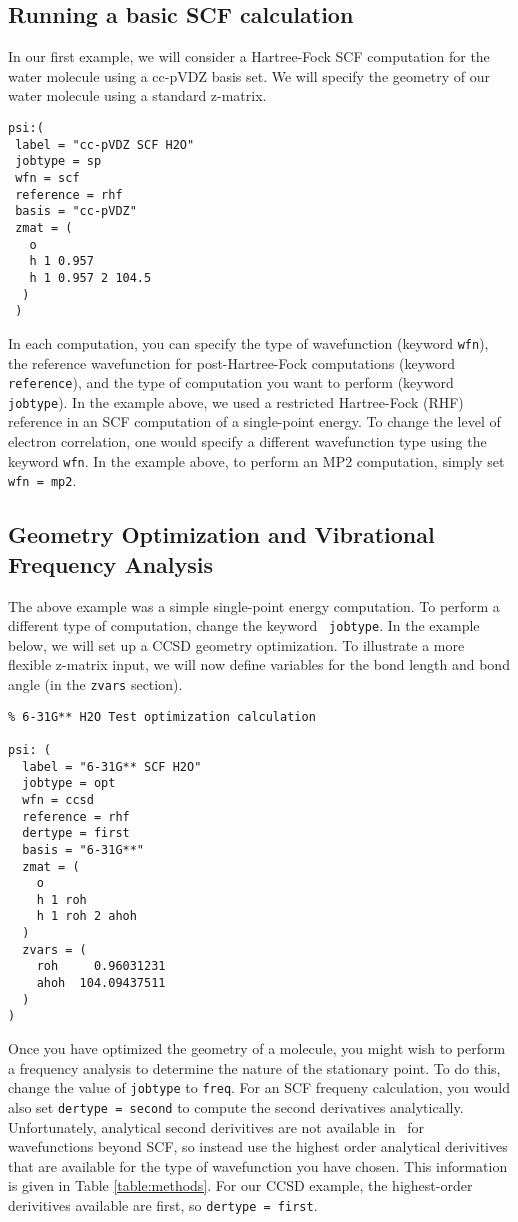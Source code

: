 \subsection{Running a basic SCF calculation}
In our first example, we will consider a Hartree-Fock SCF computation
for the water molecule using a cc-pVDZ basis set.  We will specify the
geometry of our water molecule using a standard z-matrix.

\begin{verbatim}
psi:(
 label = "cc-pVDZ SCF H2O"
 jobtype = sp
 wfn = scf
 reference = rhf
 basis = "cc-pVDZ"
 zmat = (
   o
   h 1 0.957
   h 1 0.957 2 104.5
  )
 )

\end{verbatim}

In each computation, you can specify the type of wavefunction (keyword
{\tt wfn}), the reference wavefunction for post-Hartree-Fock computations
(keyword {\tt reference}), and the type of computation you want to
perform (keyword {\tt jobtype}).  In the example above, we used a
restricted Hartree-Fock (RHF) reference in an SCF computation of a
single-point energy.  To change the level of electron correlation, one
would specify a different wavefunction type using the keyword {\tt wfn}.
In the example above, to perform an MP2 computation, simply set {\tt
wfn = mp2}.

\subsection{Geometry Optimization and Vibrational Frequency Analysis}
The above example was a simple single-point energy computation.
To perform a different type of computation, change the keyword {\tt
jobtype}.  In the example below, we will set up
a CCSD geometry optimization.  To illustrate a more flexible z-matrix
input, we will now define variables for the bond length and bond angle
(in the {\tt zvars} section).

\begin{verbatim}
% 6-31G** H2O Test optimization calculation

psi: (
  label = "6-31G** SCF H2O"
  jobtype = opt
  wfn = ccsd
  reference = rhf
  dertype = first
  basis = "6-31G**"
  zmat = (
    o
    h 1 roh
    h 1 roh 2 ahoh
  )
  zvars = (
    roh     0.96031231
    ahoh  104.09437511
  )
)
\end{verbatim}

Once you have optimized the geometry of a molecule, you might wish to
perform a frequency analysis to determine the nature of the stationary
point.  To do this, change the value of {\tt jobtype} to {\tt freq}.
For an SCF frequeny calculation, you would also set {\tt dertype =
second} to compute the second derivatives analytically.  Unfortunately,
analytical second derivitives are not available in \PSIthree\ for
wavefunctions beyond SCF, so instead use the highest order analytical
derivitives that are available for the type of wavefunction you
have chosen.  This information is given in Table \ref{table:methods}.
For our CCSD example, the highest-order derivitives available are first,
so {\tt dertype = first}.

